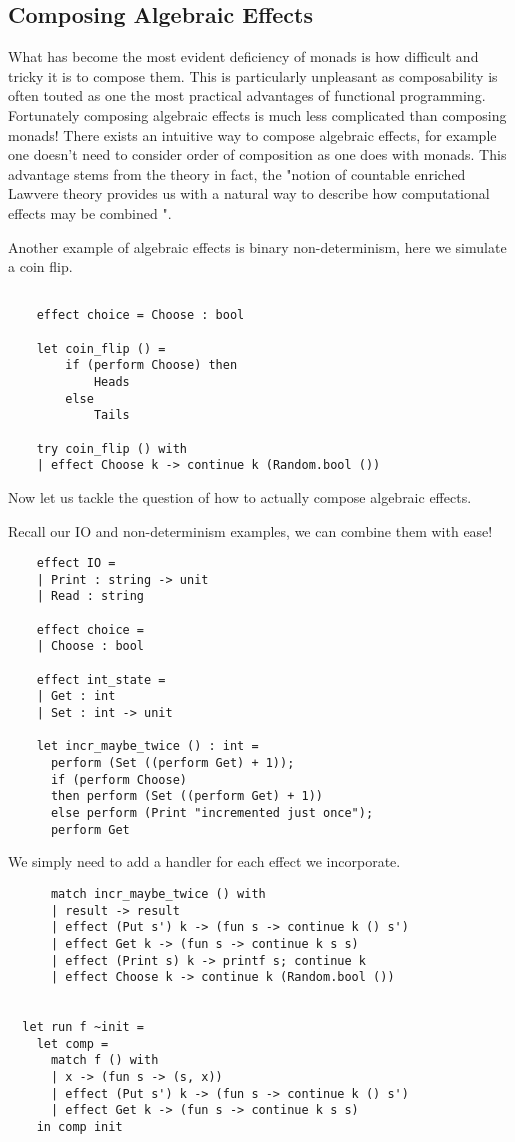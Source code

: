 \subsection{Composing Algebraic Effects}
What has become the most evident deficiency of monads is
how difficult and tricky it is to compose them.
This is particularly unpleasant as
composability is often touted as one the most practical advantages of functional programming.
Fortunately composing algebraic effects is much less complicated than composing monads!
There exists an intuitive way to compose algebraic effects,
for example one doesn't need to consider order of composition as one does with monads.
This advantage stems from the theory in fact,
the "notion of countable enriched Lawvere theory
provides us with a natural way to describe
how computational effects may be combined
"\cite{plotkin2004computational}.

Another example of algebraic effects is binary non-determinism,
here we simulate a coin flip.\\
\begin{example}\begin{verbatim}

    effect choice = Choose : bool

    let coin_flip () =
        if (perform Choose) then
            Heads
        else
            Tails

    try coin_flip () with
    | effect Choose k -> continue k (Random.bool ())
    \end{verbatim}
\end{example}
Now let us tackle the question of how to actually compose
algebraic effects.\\

\begin{example}
    Recall our IO and non-determinism examples,
    we can combine them with ease!
\begin{verbatim}
    effect IO =
    | Print : string -> unit
    | Read : string

    effect choice =
    | Choose : bool

    effect int_state =
    | Get : int
    | Set : int -> unit

    let incr_maybe_twice () : int =
      perform (Set ((perform Get) + 1));
      if (perform Choose)
      then perform (Set ((perform Get) + 1))
      else perform (Print "incremented just once");
      perform Get
\end{verbatim}
    We simply need to add a handler for each effect we incorporate.
\begin{verbatim}
      match incr_maybe_twice () with
      | result -> result
      | effect (Put s') k -> (fun s -> continue k () s')
      | effect Get k -> (fun s -> continue k s s)
      | effect (Print s) k -> printf s; continue k
      | effect Choose k -> continue k (Random.bool ())


  let run f ~init =
    let comp =
      match f () with
      | x -> (fun s -> (s, x))
      | effect (Put s') k -> (fun s -> continue k () s')
      | effect Get k -> (fun s -> continue k s s)
    in comp init
\end{verbatim}
\end{example}

